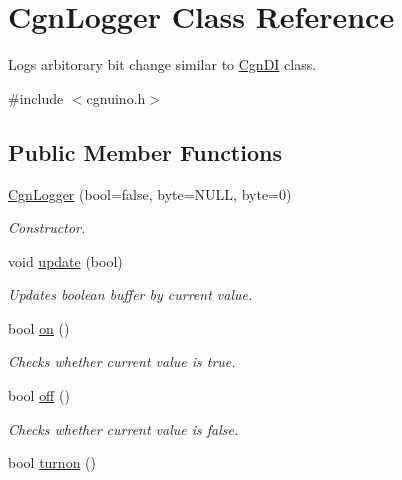 \hypertarget{classCgnLogger}{}\section{Cgn\+Logger Class Reference}
\label{classCgnLogger}


Logs arbitorary bit change similar to \hyperlink{classCgnDI}{Cgn\+DI} class.  




{\ttfamily \#include $<$cgnuino.\+h$>$}

\subsection*{Public Member Functions}
\begin{DoxyCompactItemize}
\item 
\hyperlink{classCgnLogger_aff7b14b38ccc86b1a4e1e2660013a629}{Cgn\+Logger} (bool=false, byte=N\+U\+LL, byte=0)
\begin{DoxyCompactList}\small\item\em Constructor. \end{DoxyCompactList}\item 
void \hyperlink{classCgnLogger_a10b9f485cf92d3c0922cdcbfabaebe73}{update} (bool)
\begin{DoxyCompactList}\small\item\em Updates boolean buffer by current value. \end{DoxyCompactList}\item 
bool \hyperlink{classCgnLogger_a0fdb59cf481dae0872eb978549126eca}{on} ()\hypertarget{classCgnLogger_a0fdb59cf481dae0872eb978549126eca}{}\label{classCgnLogger_a0fdb59cf481dae0872eb978549126eca}

\begin{DoxyCompactList}\small\item\em Checks whether current value is {\ttfamily true}. \end{DoxyCompactList}\item 
bool \hyperlink{classCgnLogger_a7b20a0a1a38f1e2c5fab1f50d7dacceb}{off} ()\hypertarget{classCgnLogger_a7b20a0a1a38f1e2c5fab1f50d7dacceb}{}\label{classCgnLogger_a7b20a0a1a38f1e2c5fab1f50d7dacceb}

\begin{DoxyCompactList}\small\item\em Checks whether current value is {\ttfamily false}. \end{DoxyCompactList}\item 
bool \hyperlink{classCgnLogger_aefba7d9184677add6d60dbfafed12e06}{turnon} ()\hypertarget{classCgnLogger_aefba7d9184677add6d60dbfafed12e06}{}\label{classCgnLogger_aefba7d9184677add6d60dbfafed12e06}


\end{DoxyCompactItemize}
